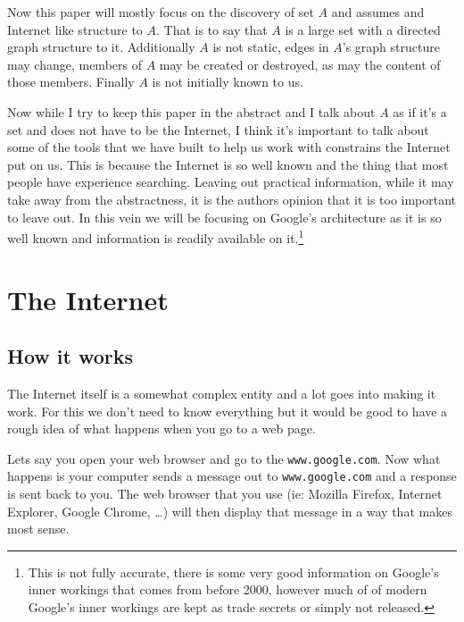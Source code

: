\documentclass{article}
\begin{document}
	Now this paper will mostly focus on the discovery of set $A$ and assumes and Internet like structure to $A$. That is to say that $A$ is a large set with a directed graph structure to it. Additionally $A$ is not static, edges in $A$'s graph structure may change, members of $A$ may be created or destroyed, as may the content of those members. Finally $A$ is not initially known to us.
	
	Now while I try to keep this paper in the abstract and I talk about $A$ as if it's a set and does not have to be the Internet, I think it's important to talk about some of the tools that we have built to help us work with constrains the Internet put on us. This is because the Internet is so well known and the thing that most people have experience searching. Leaving out practical information, while it may take away from the abstractness, it is the authors opinion that it is too important to leave out. In this vein we will be focusing on Google's architecture as it is so well known and information is readily available on it.\footnote{This is not fully accurate, there is some very good information on Google's inner workings that comes from before 2000, however much of of modern Google's inner workings are kept as trade secrets or simply not released.}
	
	
	
	
	\section{The Internet}
	
	\subsection{How it works}
	The Internet itself is a somewhat complex entity and a lot goes into making it work. For this we don't need to know everything  but it would be good to have a rough idea of what happens when you go to a web page.
	
	Lets say you open your web browser and go to the \verb|www.google.com|. Now what happens is your computer sends a message out to \verb|www.google.com| and a response is sent back to you. The web browser that you use (ie: Mozilla Firefox, Internet Explorer, Google Chrome, \ldots) will then display that message in a way that makes most sense.
	
\end{document}
